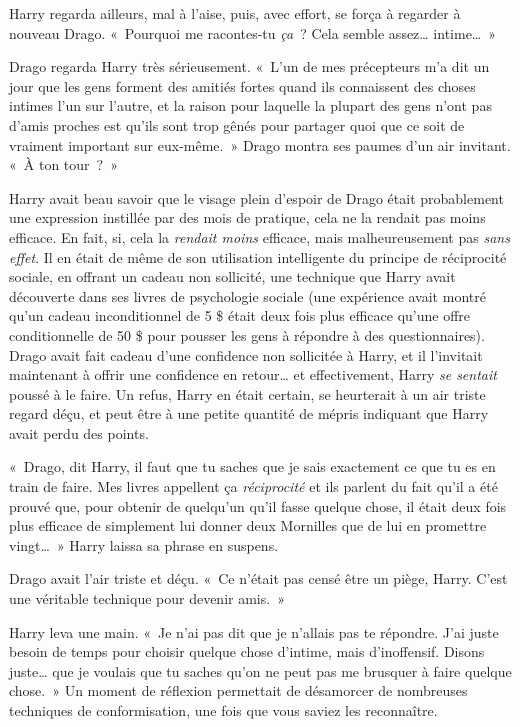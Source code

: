 Harry regarda ailleurs, mal à l'aise, puis, avec effort, se força à regarder à nouveau Drago.
«~Pourquoi me racontes-tu \emph{ça}~? Cela semble assez… intime…~»

Drago regarda Harry très sérieusement.
«~L'un de mes précepteurs m'a dit un jour que les gens forment des amitiés fortes quand ils connaissent des choses intimes l'un sur l'autre, et la raison pour laquelle la plupart des gens n'ont pas d'amis proches est qu'ils sont trop gênés pour partager quoi que ce soit de vraiment important sur eux-même.~»
Drago montra ses paumes d'un air invitant. «~À ton tour~?~»

Harry avait beau savoir que le visage plein d'espoir de Drago était probablement une expression instillée par des mois de pratique, cela ne la rendait pas moins efficace.
En fait, si, cela la \emph{rendait moins} efficace, mais malheureusement pas \emph{sans effet}.
Il en était de même de son utilisation intelligente du principe de réciprocité sociale, en offrant un cadeau non sollicité, une technique que Harry avait découverte dans ses livres de psychologie sociale (une expérience avait montré qu'un cadeau inconditionnel de 5 \$ était deux fois plus efficace qu'une offre conditionnelle de 50 \$ pour pousser les gens à répondre à des questionnaires).
Drago avait fait cadeau d'une confidence non sollicitée à Harry, et il l'invitait maintenant à offrir une confidence en retour… et effectivement, Harry \emph{se sentait} poussé à le faire.
Un refus, Harry en était certain, se heurterait à un air triste regard déçu, et peut être à une petite quantité de mépris indiquant que Harry avait perdu des points.

«~Drago, dit Harry, il faut que tu saches que je sais exactement ce que tu es en train de faire. Mes livres appellent ça \emph{réciprocité} et ils parlent du fait qu'il a été prouvé que, pour obtenir de quelqu'un qu'il fasse quelque chose, il était deux fois plus efficace de simplement lui donner deux Mornilles que de lui en promettre vingt…~» Harry laissa sa phrase en suspens.

Drago avait l'air triste et déçu. «~Ce n'était pas censé être un piège, Harry. C'est une véritable technique pour devenir amis.~»

Harry leva une main. «~Je n'ai pas dit que je n'allais pas te répondre. J'ai juste besoin de temps pour choisir quelque chose d'intime, mais d'inoffensif. Disons juste… que je voulais que tu saches qu'on ne peut pas me brusquer à faire quelque chose.~» Un moment de réflexion permettait de désamorcer de nombreuses techniques de conformisation, une fois que vous saviez les reconnaître.

